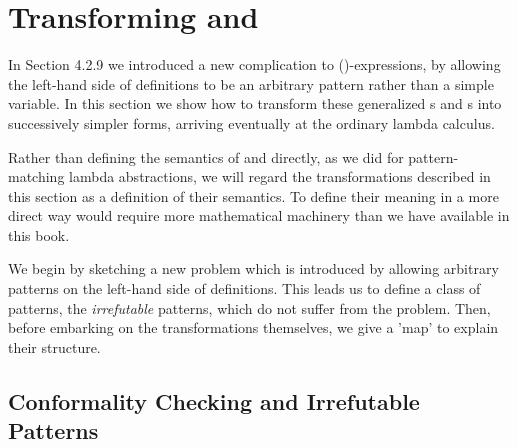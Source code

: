 {


\section{Transforming  and }

In Section 4.2.9 we introduced a new complication to ()-expressions, by
allowing the left-hand side of definitions to be an arbitrary pattern rather than
a simple variable. In this section we show how to transform these generalized
s and s into successively simpler forms, arriving eventually at the
ordinary lambda calculus.

Rather than defining the semantics of  and  directly, as we did for
pattern-matching lambda abstractions, we will regard the transformations
described in this section as a definition of their semantics. To define their
meaning in a more direct way would require more mathematical machinery
than we have available in this book.

We begin by sketching a new problem which is introduced by allowing
arbitrary patterns on the left-hand side of definitions. This leads us to define a
class of patterns, the \textit{irrefutable} patterns, which do not suffer from the
problem. Then, before embarking on the transformations themselves, we
give a 'map' to explain their structure.

\subsection{Conformality Checking and Irrefutable Patterns}

}
